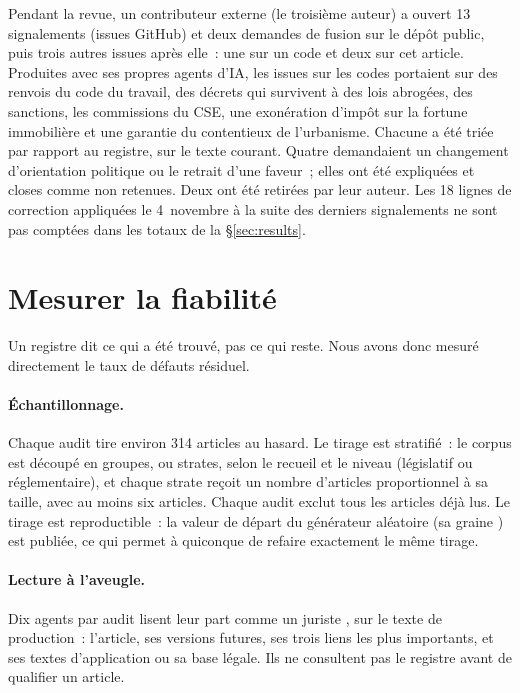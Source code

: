 \documentclass[11pt,a4paper]{article}
\begin{document}
Pendant la revue, un contributeur externe (le troisième auteur) a ouvert 13 signalements (\og issues \fg{} GitHub) et deux demandes de fusion sur le dépôt public, puis trois autres issues après elle~: une sur un code et deux sur cet article. Produites avec ses propres agents d'IA, les issues sur les codes portaient sur des renvois du code du travail, des décrets qui survivent à des lois abrogées, des sanctions, les commissions du CSE, une exonération d'impôt sur la fortune immobilière et une garantie du contentieux de l'urbanisme. Chacune a été triée par rapport au registre, sur le texte courant. Quatre demandaient un changement d'orientation politique ou le retrait d'une faveur~; elles ont été expliquées et closes comme non retenues. Deux ont été retirées par leur auteur. Les 18 lignes de correction appliquées le 4~novembre à la suite des derniers signalements ne sont pas comptées dans les totaux de la \S\ref{sec:results}.

\section{Mesurer la fiabilité}
\label{sec:measure}

Un registre dit ce qui a été trouvé, pas ce qui reste. Nous avons donc mesuré directement le taux de défauts résiduel.

\paragraph{Échantillonnage.}
Chaque audit tire environ 314 articles au hasard. Le tirage est stratifié~: le corpus est découpé en groupes, ou strates, selon le recueil et le niveau (législatif ou réglementaire), et chaque strate reçoit un nombre d'articles proportionnel à sa taille, avec au moins six articles. Chaque audit exclut tous les articles déjà lus. Le tirage est reproductible~: la valeur de départ du générateur aléatoire (sa \og graine \fg{}) est publiée, ce qui permet à quiconque de refaire exactement le même tirage.

\paragraph{Lecture à l'aveugle.}
Dix agents par audit lisent leur part \og comme un juriste \fg{}, sur le texte de production~: l'article, ses versions futures, ses trois liens les plus importants, et ses textes d'application ou sa base légale. Ils ne consultent pas le registre avant de qualifier un article.
\end{document}
